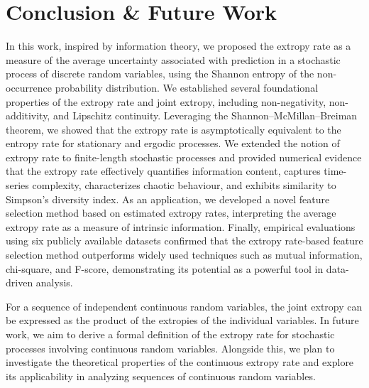 \documentclass[pdflatex]{sn-jnl}%
\theoremstyle{thmstyleone}
\theoremstyle{thmstyletwo}%
\theoremstyle{thmstylethree}%
\begin{document}
\section{Conclusion \& Future Work}\label{conclusion}
In this work, inspired by information theory, we proposed the extropy rate as a measure of the average uncertainty associated with prediction in a stochastic process of discrete random variables, using the Shannon entropy of the non-occurrence probability distribution. We established several foundational properties of the extropy rate and joint extropy, including non-negativity, non-additivity, and Lipschitz continuity. Leveraging the Shannon–McMillan–Breiman theorem, we showed that the extropy rate is asymptotically equivalent to the entropy rate for stationary and ergodic processes. We extended the notion of extropy rate to finite-length stochastic processes and provided numerical evidence that the extropy rate effectively quantifies information content, captures time-series complexity, characterizes chaotic behaviour, and exhibits similarity to Simpson’s diversity index. As an application, we developed a novel feature selection method based on estimated extropy rates, interpreting the average extropy rate as a measure of intrinsic information. Finally, empirical evaluations using six publicly available datasets confirmed that the extropy rate-based feature selection method outperforms widely used techniques such as mutual information, chi-square, and F-score, demonstrating its potential as a powerful tool in data-driven analysis.

For a sequence of independent continuous random variables, the joint extropy can be expressed as the product of the extropies of the individual variables\cite{balakrishnan2022weighted}. In future work, we aim to derive a formal definition of the extropy rate for stochastic processes involving continuous random variables. Alongside this, we plan to investigate the theoretical properties of the continuous extropy rate and explore its applicability in analyzing sequences of continuous random variables.



\end{document}
